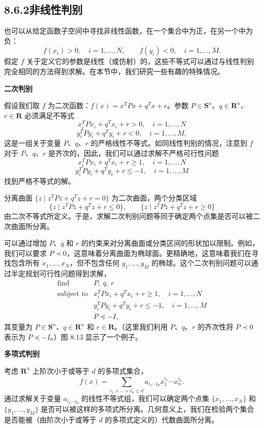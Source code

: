 \documentclass[UTF8,12pt,a4paper,fontset=fandol]{ctexart}
\begin{document}
\subsection*{8.6.2\quad 非线性判别}

也可以从给定函数子空间中寻找非线性函数，在一个集合中为正，在另一个中为负：
\[
f(x_i)>0,\quad i=1,\ldots,N,\qquad f(y_i)<0,\quad i=1,\ldots,M.
\]
假定 $f$ 关于定义它的参数是线性（或仿射）的，这些不等式可以通过与线性判别完全相同的方法得到求解。在本节中，我们研究一些有趣的特殊情况。

\noindent\textbf{二次判别}

假设我们取 $f$ 为二次函数：$f(x)=x^TPx+q^Tx+r$。参数 $P\in\mathbf{S}^n$、$q\in\mathbf{R}^n$、$r\in\mathbf{R}$ 必须满足不等式
\[
x_i^TPx_i+q^Tx_i+r>0,\quad i=1,\ldots,N
\]
\[
y_i^TPy_i+q^Ty_i+r<0,\quad i=1,\ldots,M,
\]
这是一组关于变量 $P$、$q$、$r$ 的严格线性不等式。如同线性判别的情况，注意到 $f$ 对于 $P$、$q$、$r$ 是齐次的，因此，我们可以通过求解不严格可行性问题
\[
x_i^TPx_i+q^Tx_i+r\geq 1,\quad i=1,\ldots,N
\]
\[
y_i^TPy_i+q^Ty_i+r\leq -1,\quad i=1,\ldots,M
\]
找到严格不等式的解。

分离曲面 $\{z\mid z^TPz+q^Tz+r=0\}$ 为二次曲面，两个分类区域
\[
\{z\mid z^TPz+q^Tz+r\leq 0\},\qquad
\{z\mid z^TPz+q^Tz+r\geq 0\}
\]
由二次不等式所定义。于是，求解二次判别问题等同于确定两个点集是否可以被二次曲面所分离。

可以通过增加 $P$、$q$ 和 $r$ 的约束来对分离曲面或分类区间的形状加以限制。例如，我们可以要求 $P\prec 0$，这意味着分离曲面为椭球面。更精确地，这意味着我们在寻找包含所有 $x_1,\ldots,x_N$，但不包含任何 $y_1,\ldots,y_M$ 的椭球。这个二次判别问题可以通过半定规划可行性问题得到求解，
\[
\begin{array}{ll}
\mbox{find} & P,\ q,\ r\\
\mbox{subject to} & x_i^TPx_i+q^Tx_i+r\geq 1,\quad i=1,\ldots,N\\
& y_i^TPy_i+q^Ty_i+r\leq -1,\quad i=1,\ldots,M\\
& P\preceq -I,
\end{array}
\]
其变量为 $P\in\mathbf{S}^n$、$q\in\mathbf{R}^n$ 和 $r\in\mathbf{R}$。（这里我们利用 $P$、$q$、$r$ 的齐次性将 $P\prec 0$ 表示为 $P\preceq -I$。）图 8.13 显示了一个例子。

\noindent\textbf{多项式判别}

考虑 $\mathbf{R}^n$ 上阶次小于或等于 $d$ 的多项式集合，
\[
f(x)=\sum_{i_1+\cdots+i_n\leq d} a_{i_1\cdots i_d}x_1^{i_1}\cdots x_n^{i_n}.
\]
通过求解关于变量 $a_{i_1\cdots i_d}$ 的线性不等式组，我们可以确定两个点集 $\{x_1,\ldots,x_N\}$ 和 $\{y_1,\ldots,y_M\}$ 是否可以被这样的多项式所分离。几何意义上，我们在检验两个集合是否能被（由阶次小于或等于 $d$ 的多项式定义的）代数曲面所分离。
\end{document}
